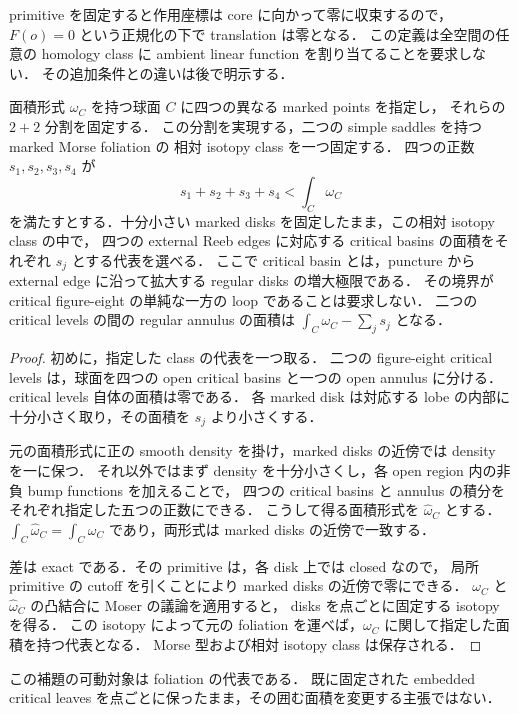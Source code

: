 primitive を固定すると作用座標は core に向かって零に収束するので，
$F(o)=0$ という正規化の下で translation は零となる．
この定義は全空間の任意の homology class に ambient linear function を割り当てることを要求しない．
その追加条件との違いは後で明示する．

\begin{lemma}
\label{per:lobe-areas}
面積形式 $\omega_C$ を持つ球面 $C$ に四つの異なる marked points を指定し，
それらの $2+2$ 分割を固定する．
この分割を実現する，二つの simple saddles を持つ marked Morse foliation の
相対 isotopy class を一つ固定する．
四つの正数 $s_1,s_2,s_3,s_4$ が
\[
 s_1+s_2+s_3+s_4<\int_C\omega_C
\]
を満たすとする．十分小さい marked disks を固定したまま，この相対 isotopy class の中で，
四つの external Reeb edges に対応する critical basins の面積をそれぞれ $s_j$ とする代表を選べる．
ここで critical basin とは，puncture から external edge に沿って拡大する regular disks の増大極限である．
その境界が critical figure-eight の単純な一方の loop であることは要求しない．
二つの critical levels の間の regular annulus の面積は
$\int_C\omega_C-\sum_js_j$ となる．
\end{lemma}

\begin{proof}
初めに，指定した class の代表を一つ取る．
二つの figure-eight critical levels は，球面を四つの open critical basins と一つの open annulus に分ける．
critical levels 自体の面積は零である．
各 marked disk は対応する lobe の内部に十分小さく取り，その面積を $s_j$ より小さくする．

元の面積形式に正の smooth density を掛け，marked disks の近傍では density を一に保つ．
それ以外ではまず density を十分小さくし，各 open region 内の非負 bump functions を加えることで，
四つの critical basins と annulus の積分をそれぞれ指定した五つの正数にできる．
こうして得る面積形式を $\widehat\omega_C$ とする．
$\int_C\widehat\omega_C=\int_C\omega_C$ であり，両形式は marked disks の近傍で一致する．

差は exact である．その primitive は，各 disk 上では closed なので，
局所 primitive の cutoff を引くことにより marked disks の近傍で零にできる．
$\omega_C$ と $\widehat\omega_C$ の凸結合に Moser の議論を適用すると，
disks を点ごとに固定する isotopy を得る．
この isotopy によって元の foliation を運べば，$\omega_C$ に関して指定した面積を持つ代表となる．
Morse 型および相対 isotopy class は保存される．
\end{proof}

この補題の可動対象は foliation の代表である．
既に固定された embedded critical leaves を点ごとに保ったまま，その囲む面積を変更する主張ではない．

